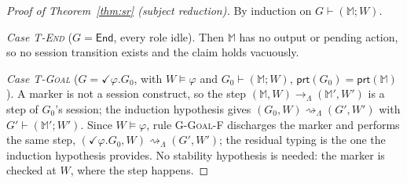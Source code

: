 \documentclass{article}
\theoremstyle{plain}
\theoremstyle{definition}
\newcommand{\reach}{\rightsquigarrow}
\newcommand{\MM}{\mathbb{M}}
\newcommand{\prt}[1]{\mathsf{prt}(#1)}
\newcommand{\End}{\mathsf{End}}
\def \bgc {}
\def \egc {}
\begin{document}
\begin{proof}[Proof of Theorem~\ref{thm:sr} (subject reduction)]
By induction on $G\vdash(\MM;W)$.

\bgc\emph{Case \textsc{T-End}} ($G=\End$, every role idle). Then $\MM$ has no
output or pending action, so no session transition exists and the claim holds
vacuously.

\emph{Case \textsc{T-Goal}} ($G=\checkmark\varphi.G_0$, with $W\vDash\varphi$ and
$G_0\vdash(\MM;W)$, $\prt{G_0}=\prt\MM$). A marker is not a session construct,
so the step $(\MM,W)\to_\Lambda(\MM',W')$ is a step of $G_0$'s session; the
induction hypothesis gives $(G_0,W)\reach_\Lambda(G',W')$ with
$G'\vdash(\MM';W')$. Since $W\vDash\varphi$, rule \textsc{G-Goal-F} discharges
the marker and performs the same step,
$(\checkmark\varphi.G_0,W)\reach_\Lambda(G',W')$; the residual typing is the one
the induction hypothesis provides. No stability hypothesis is needed: the
marker is checked at $W$, where the step happens.\egc


\end{proof}
\end{document}
